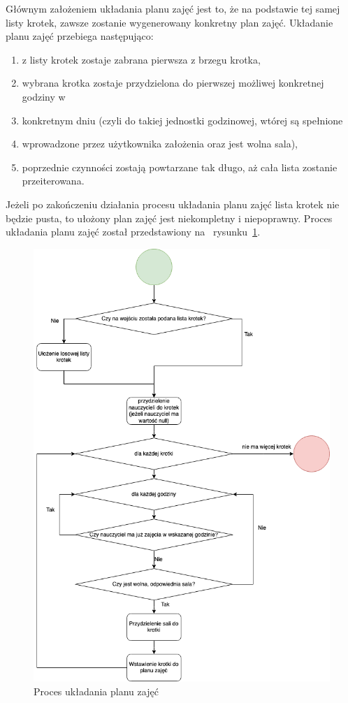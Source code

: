     Głównym założeniem układania planu zajęć jest to, że na podstawie tej samej listy krotek, zawsze zostanie wygenerowany konkretny plan zajęć. 
Układanie planu zajęć przebiega następująco:
\begin{enumerate}
	\item z listy krotek zostaje zabrana pierwsza z brzegu krotka,
	\item wybrana krotka zostaje przydzielona do pierwszej możliwej konkretnej godziny w 		\item konkretnym dniu (czyli do takiej jednostki godzinowej, wtórej są spełnione 			\item wprowadzone przez użytkownika założenia oraz jest wolna sala),
	\item poprzednie czynności zostają powtarzane tak długo, aż cała lista zostanie przeiterowana.
\end{enumerate}
Jeżeli po zakończeniu działania procesu układania planu zajęć lista krotek nie będzie pusta, to ułożony plan zajęć jest niekompletny i niepoprawny. Proces układania planu zajęć został przedstawiony na ~rysunku~\ref{rys:time_table_prep}.

\begin{figure}[!ht]
\centering\includegraphics[width=\textwidth]{figures/time_table_prep}
\caption{Proces układania planu zajęć}\label{rys:time_table_prep}
\end{figure}

